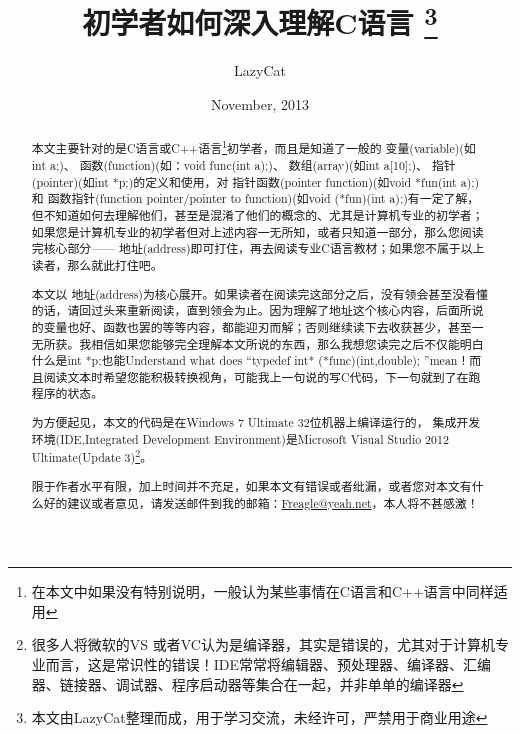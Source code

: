 \documentclass[11pt,twoside,a4paper,titlepage]{article}	%
\newcommand{\sihao}{\fontsize{14pt}{21pt}\selectfont}		%
\newcommand{\kw}[1]{\textcolor[rgb]{0.0,0.0,0.63}{ #1}}
\begin{document}
\title{初学者如何深入理解C语言										%
      \thanks{本文由LazyCat整理而成，用于学习交流，未经许可，严禁用于商业用途}
}
\author{LazyCat}                		    %
\date{November, 2013}		 			               	%
\maketitle									%

\newpage
\begin{abstract}
本文主要针对的是C语言或C++语言\footnote{在本文中如果没有特别说明，一般认为某些事情在C语言和C++语言中同样适用}初学者，而且是知道了一般的\kw{变量(variable)}(如int a;)、\kw{函数(function)}(如：void func(int a);)、\kw{数组(array)}(如int a[10];)、\kw{指针(pointer)}(如int *p;)的定义和使用，对\kw{指针函数(pointer function)}(如void *fun(int a);)和\kw{函数指针(function pointer/pointer to function)}(如void (*fun)(int a);)有一定了解，但不知道如何去理解他们，甚至是混淆了他们的概念的、尤其是计算机专业的初学者；如果您是计算机专业的初学者但对上述内容一无所知，或者只知道一部分，那么您阅读完核心部分——\kw{地址(address)}即可打住，再去阅读专业C语言教材；如果您不属于以上读者，那么就此打住吧。

本文以\kw{地址(address)}为核心展开。如果读者在阅读完这部分之后，没有领会甚至没看懂的话，请回过头来重新阅读，直到领会为止。因为理解了地址这个核心内容，后面所说的变量也好、函数也罢的等等内容，都能迎刃而解；否则继续读下去收获甚少，甚至一无所获。我相信如果您能够完全理解本文所说的东西，那么我想您读完之后不仅能明白什么是int *p;也能Understand what does “typedef int* (*func)(int,double); ”mean！而且阅读文本时希望您能积极转换视角，可能我上一句说的写C代码，下一句就到了在跑程序的状态。

为方便起见，本文的代码是在Windows 7 Ultimate 32位机器上编译运行的，\kw{集成开发环境(IDE,Integrated Development Environment)}是Microsoft Visual Studio 2012 Ultimate(Update 3)\footnote{很多人将微软的VS 或者VC认为是编译器，其实是错误的，尤其对于计算机专业而言，这是常识性的错误！IDE常常将编辑器、预处理器、编译器、汇编器、链接器、调试器、程序启动器等集合在一起，并非单单的编译器}。

限于作者水平有限，加上时间并不充足，如果本文有错误或者纰漏，或者您对本文有什么好的建议或者意见，请发送邮件到我的邮箱：\href{mailto:Freagle@yeah.net}{Freagle@yeah.net}，本人将不甚感激！
\end{abstract}

\newpage
{\yahei{\sihao{\tableofcontents}}}			%
\end{document}
